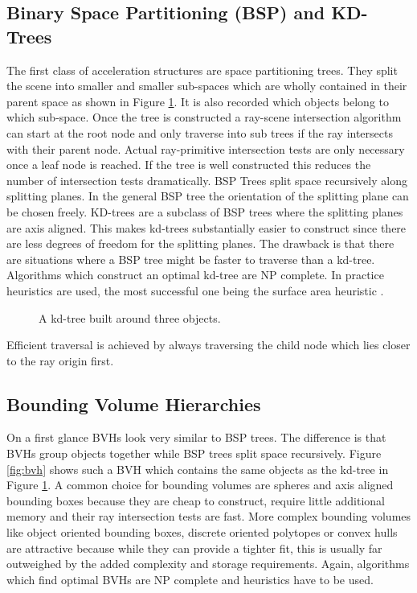 \documentclass{ACGSeminar}
\begin{document}
\subsection{Binary Space Partitioning (BSP) and KD-Trees}
The first class of acceleration structures are space partitioning trees. They split the scene into smaller and smaller sub-spaces which are wholly contained in their parent space as shown in Figure \ref{fig:kd-tree}. It is also recorded which objects belong to which sub-space. Once the tree is constructed a ray-scene intersection algorithm can start at the root node and only traverse into sub trees if the ray intersects with their parent node. Actual ray-primitive intersection tests are only necessary once a leaf node is reached. If the tree is well constructed this reduces the number of intersection tests dramatically.
BSP Trees split space recursively along splitting planes. In the general BSP tree the orientation of the splitting plane can be chosen freely. KD-trees are a subclass of BSP trees where the splitting planes are axis aligned. This makes kd-trees substantially easier to construct since there are less degrees of freedom for the splitting planes. The drawback is that there are situations where a BSP tree might be faster to traverse than a kd-tree.
Algorithms which construct an optimal kd-tree are NP complete. In practice heuristics are used, the most successful one being the surface area heuristic \cite{MacDonald1990}.

\begin{figure}[htb!]
  \centering
  
  \caption{A kd-tree built around three objects.}
  \label{fig:kd-tree}
\end{figure}

Efficient traversal is achieved by always traversing the child node which lies closer to the ray origin first.

\subsection{Bounding Volume Hierarchies}
On a first glance BVHs look very similar to BSP trees. The difference is that BVHs group objects together while BSP trees split space recursively. Figure \ref{fig:bvh} shows such a BVH which contains the same objects as the kd-tree in Figure \ref{fig:kd-tree}. A common choice for bounding volumes are spheres and axis aligned bounding boxes because they are cheap to construct, require little additional memory and their ray intersection tests are fast. More complex bounding volumes like object oriented bounding boxes, discrete oriented polytopes or convex hulls are attractive because while they can provide a tighter fit, this is usually far outweighed by the added complexity and storage requirements.
Again, algorithms which find optimal BVHs are NP complete and heuristics have to be used.
\end{document}
